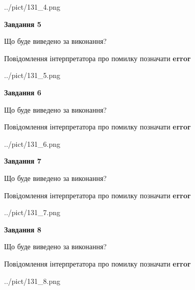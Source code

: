 \documentclass[12pt, ukrainian]{article}
\begin{document}
{\begin{center}
	{../pict/131_4.png}
\end{center}
\newpage

{\begin {center}\textbf{Завдання 5}\end {center}}\par
Що буде виведено за виконання? \par
Повідомлення інтерпретатора про помилку позначати \textbf{error}

\begin{center}
	{../pict/131_5.png}
\end{center}
\newpage

{\begin {center}\textbf{Завдання 6}\end {center}}\par
Що буде виведено за виконання? \par
Повідомлення інтерпретатора про помилку позначати \textbf{error}

\begin{center}
	{../pict/131_6.png}
\end{center}
\newpage

{\begin {center}\textbf{Завдання 7}\end {center}}\par
Що буде виведено за виконання? \par
Повідомлення інтерпретатора про помилку позначати \textbf{error}

\begin{center}
	{../pict/131_7.png}
\end{center}
\newpage

{\begin {center}\textbf{Завдання 8}\end {center}}\par
Що буде виведено за виконання? \par
Повідомлення інтерпретатора про помилку позначати \textbf{error}

\begin{center}
	{../pict/131_8.png}
\end{center}
\newpage

}
\end{document}
